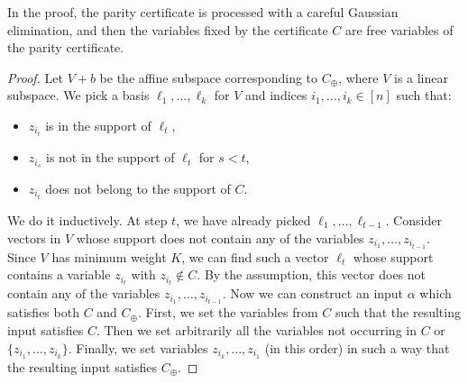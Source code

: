 In the proof, the parity certificate is processed with a careful Gaussian elimination, and then the variables fixed by the certificate $C$ are free variables of the parity certificate.
\begin{proof}
Let $V+b$ be the affine subspace corresponding to $C_\oplus$, where $V$ is a linear subspace. We pick a basis $\ell_1,\ldots,\ell_k$ for $V$ and indices $i_1,\ldots,i_k\in[n]$ such that:
\begin{itemize}
\item $z_{i_t}$ is in the support of $\ell_t$,
\item $z_{i_s}$ is not in the support of $\ell_t$ for $s<t$,
\item $z_{i_t}$ does not belong to the support of $C$.
\end{itemize}
We do it inductively. At step $t$, we have already picked $\ell_1,\ldots,\ell_{t-1}$. Consider vectors in $V$ whose support does not contain any of the variables $z_{i_1},\ldots,z_{i_{t-1}}$. Since $V$ has minimum weight $K$, we can find such a vector $\ell_t$ whose support contains a variable $z_{i_t}$ with $z_{i_t}\notin C$. By the assumption, this vector does not contain any of the variables $z_{i_1},\ldots,z_{i_{t-1}}$.
Now we can construct an input $\alpha$ which satisfies both $C$ and $C_\oplus$. First, we set the variables from $C$ such that the resulting input satisfies $C$. Then we set arbitrarily all the variables not occurring in $C$ or $\{z_{i_1},\ldots,z_{i_k}\}$. Finally, we set variables $z_{i_k},\ldots,z_{i_1}$ (in this order) in such a way that the resulting input satisfies $C_\oplus$.
\end{proof}
